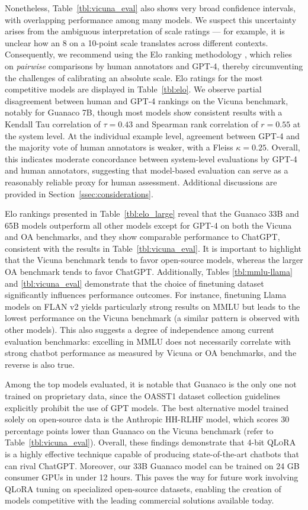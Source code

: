 Nonetheless, Table~\ref{tbl:vicuna_eval} also shows very broad confidence intervals, with overlapping performance among many models. We suspect this uncertainty arises from the ambiguous interpretation of scale ratings — for example, it is unclear how an 8 on a 10-point scale translates across different contexts. Consequently, we recommend using the Elo ranking methodology \citep{elo1967proposed}, which relies on \textit{pairwise} comparisons by human annotators and GPT-4, thereby circumventing the challenges of calibrating an absolute scale. Elo ratings for the most competitive models are displayed in Table~\ref{tbl:elo}. We observe partial disagreement between human and GPT-4 rankings on the Vicuna benchmark, notably for Guanaco 7B, though most models show consistent results with a Kendall Tau correlation of $\tau=0.43$ and Spearman rank correlation of $r=0.55$ at the system level. At the individual example level, agreement between GPT-4 and the majority vote of human annotators is weaker, with a Fleiss $\kappa=0.25$. Overall, this indicates moderate concordance between system-level evaluations by GPT-4 and human annotators, suggesting that model-based evaluation can serve as a reasonably reliable proxy for human assessment. Additional discussions are provided in Section~\ref{ssec:considerations}.

Elo rankings presented in Table~\ref{tbl:elo_large} reveal that the {Guanaco} 33B and 65B models outperform all other models except for GPT-4 on both the Vicuna and OA benchmarks, and they show comparable performance to ChatGPT, consistent with the results in Table~\ref{tbl:vicuna_eval}. It is important to highlight that the Vicuna benchmark tends to favor open-source models, whereas the larger OA benchmark tends to favor ChatGPT. Additionally, Tables \ref{tbl:mmlu-llama} and \ref{tbl:vicuna_eval} demonstrate that the choice of finetuning dataset significantly influences performance outcomes. For instance, finetuning Llama models on FLAN v2 yields particularly strong results on MMLU but leads to the lowest performance on the Vicuna benchmark (a similar pattern is observed with other models). This also suggests a degree of independence among current evaluation benchmarks: excelling in MMLU does not necessarily correlate with strong chatbot performance as measured by Vicuna or OA benchmarks, and the reverse is also true.

Among the top models evaluated, it is notable that {Guanaco} is the only one not trained on proprietary data, since the OASST1 dataset collection guidelines explicitly prohibit the use of GPT models. The best alternative model trained solely on open-source data is the Anthropic HH-RLHF model, which scores 30 percentage points lower than {Guanaco} on the Vicuna benchmark (refer to Table~\ref{tbl:vicuna_eval}). Overall, these findings demonstrate that 4-bit \textsc{QLoRA} is a highly effective technique capable of producing state-of-the-art chatbots that can rival ChatGPT. Moreover, our 33B {Guanaco} model can be trained on 24 GB consumer GPUs in under 12 hours. This paves the way for future work involving \textsc{QLoRA} tuning on specialized open-source datasets, enabling the creation of models competitive with the leading commercial solutions available today.

